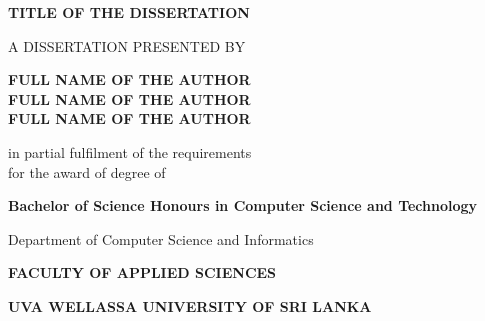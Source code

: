 \begin{titlepage}
    \begin{center}
        \textbf{\large \uppercase{TITLE OF THE DISSERTATION}}

        \vfill

        \uppercase{A DISSERTATION PRESENTED BY}

        \vfill

        \textbf{FULL NAME OF THE AUTHOR} \\
        \textbf{FULL NAME OF THE AUTHOR} \\
        \textbf{FULL NAME OF THE AUTHOR}

        \vfill

        \small in partial fulfilment of the requirements \\ for the award of degree of

        \vspace{0.75cm}

        \textbf{Bachelor of Science Honours in Computer Science and Technology}

        \vfill

        Department of Computer Science and Informatics

        \vspace{0.5cm}

        \textbf{\small \uppercase{FACULTY OF APPLIED SCIENCES}}

        \vspace{0.5cm}

        \textbf{\uppercase{UVA WELLASSA UNIVERSITY OF SRI LANKA}}

        \vspace{1.5cm}

        \textbf{\the\year}
    \end{center}
\end{titlepage}

\clearpage
